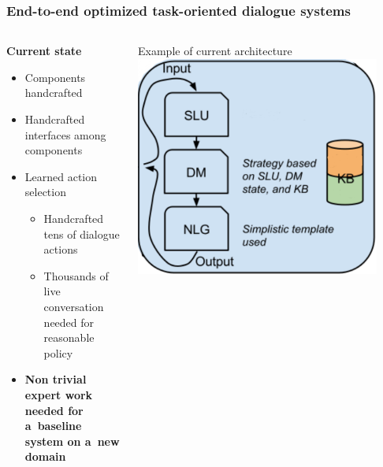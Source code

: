\documentclass[10pt, compress,british,xcolor={svgnames,dvipsnames,x11names},trans]{beamer}
\begin{document}
\begin{frame}\frametitle{End-to-end optimized task-oriented dialogue systems}
\begin{columns}
\begin{column}{0.45\textwidth}
    {\bf Current state} 
    \begin{itemize}
        \item Components handcrafted
        \item Handcrafted interfaces among components 
        \item Learned action selection
            \begin{itemize}
                \item Handcrafted tens of dialogue actions
                \item Thousands of live conversation needed for reasonable policy~\cite{gasic_line_2011}
            \end{itemize}
        \item {\bf \color{red} Non trivial expert work needed for a~baseline system on a~new domain}
    \end{itemize}
\end{column}
\begin{column}{0.2\textwidth}
        \begin{center} 
            {\tiny Example of current architecture}
            \includegraphics[width=0.9\textwidth]{arch.png} \\
        \end{center}

\end{column}
\end{columns}
\end{frame}
\end{document}

